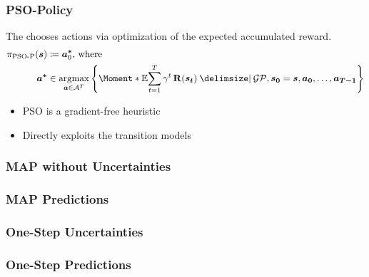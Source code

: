 \begin{frame}[label=solution_psop]
    \frametitle{PSO-Policy}

    \begin{definition}
        \label{def:psop}
        The  chooses actions via optimization of the expected accumulated reward.
        \begin{align}
            \pi_{\text{PSO-P}}(\mat{s}) &\coloneqq \mat{a^\ast}_0\text{, where} \\
            \mat{a^\ast} &\in \argmax_{\mat{a} \in \Ah^T} \left\{ \Moment*{\E}{\sum_{t=1}^T \gamma^t \Rwd(\mat{s_t}) \given \GP, \mat{s_0} = \mat{s}, \mat{a_0}, \dots, \mat{a_{T-1}}} \right\}
        \end{align}
    \end{definition}
    \begin{itemize}
        \item PSO is a gradient-free heuristic
        \item Directly exploits the transition models
    \end{itemize}
\end{frame}


\begin{frame}[label=solution_map]
    \frametitle{MAP without Uncertainties}

    \centering
\end{frame}

\begin{frame}[label=solution_map_predictions]
    \frametitle{MAP Predictions}

    \centering
\end{frame}

\begin{frame}[label=solution_os]
    \frametitle{One-Step Uncertainties}

    \centering
\end{frame}

\begin{frame}[label=solution_os_predictions]
    \frametitle{One-Step Predictions}

    \centering
\end{frame}

